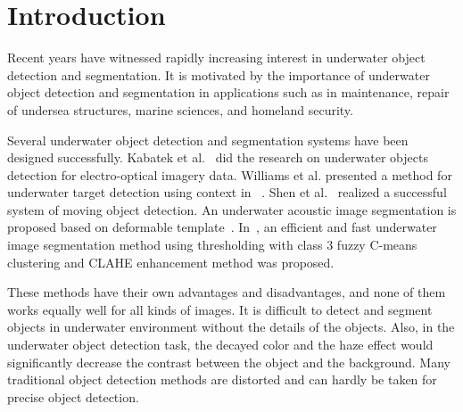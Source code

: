 \documentclass[conference]{IEEEtran}
\begin{document}
\section{Introduction}


Recent years have witnessed rapidly increasing interest in underwater object detection and segmentation. It is motivated by the importance of underwater object detection and segmentation in applications such as in maintenance, repair of undersea structures, marine sciences, and homeland security.


Several underwater object detection and segmentation systems have been designed successfully. Kabatek et al.~\cite{kabatek2009underwater} did the research on underwater objects detection for electro-optical imagery data. Williams et al. presented a method for underwater target detection using context in ~\cite{williams2010using}. Shen et al.~\cite{shen2014biological} realized a successful system of moving object detection. An underwater acoustic image segmentation is proposed based on deformable template~\cite{sang2005underwater}. In~\cite{singh2014segmentation}, an efficient and fast underwater image segmentation method using thresholding with class 3 fuzzy C-means clustering and CLAHE enhancement method was proposed.

These methods have their own advantages and disadvantages, and none of them works equally well for all kinds of images. It is difficult to detect and segment objects in underwater environment without the details of the objects. Also, in the underwater object detection task, the decayed color and the haze effect would significantly decrease the contrast between the object and the background. Many traditional object detection methods are distorted and can hardly be taken for precise object detection.
\end{document}

